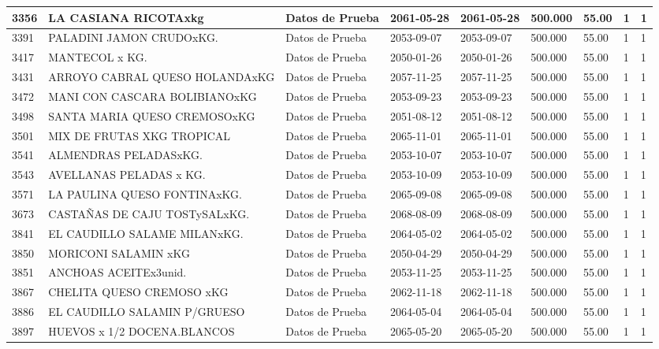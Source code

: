 \documentclass[a4paper,12pt]{article}
\begin{document}
\begin{landscape}
\begin{longtable}{|p{4cm}|p{2.5cm}|p{2.5cm}|p{1.8cm}|p{1.8cm}|p{1cm}|p{1cm}|p{3cm}|p{3cm}||}
3356 & LA CASIANA RICOTAxkg & Datos de Prueba & 2061-05-28 & 2061-05-28 & 500.000 & 55.00 & 1 & 1 \\ \hline 
3391 & PALADINI JAMON CRUDOxKG. & Datos de Prueba & 2053-09-07 & 2053-09-07 & 500.000 & 55.00 & 1 & 1 \\ \hline 
3417 & MANTECOL x KG. & Datos de Prueba & 2050-01-26 & 2050-01-26 & 500.000 & 55.00 & 1 & 1 \\ \hline 
3431 & ARROYO CABRAL QUESO HOLANDAxKG & Datos de Prueba & 2057-11-25 & 2057-11-25 & 500.000 & 55.00 & 1 & 1 \\ \hline 
3472 & MANI CON CASCARA BOLIBIANOxKG & Datos de Prueba & 2053-09-23 & 2053-09-23 & 500.000 & 55.00 & 1 & 1 \\ \hline 
3498 & SANTA MARIA QUESO CREMOSOxKG & Datos de Prueba & 2051-08-12 & 2051-08-12 & 500.000 & 55.00 & 1 & 1 \\ \hline 
3501 & MIX DE FRUTAS XKG TROPICAL & Datos de Prueba & 2065-11-01 & 2065-11-01 & 500.000 & 55.00 & 1 & 1 \\ \hline 
3541 & ALMENDRAS PELADASxKG. & Datos de Prueba & 2053-10-07 & 2053-10-07 & 500.000 & 55.00 & 1 & 1 \\ \hline 
3543 & AVELLANAS PELADAS x KG. & Datos de Prueba & 2053-10-09 & 2053-10-09 & 500.000 & 55.00 & 1 & 1 \\ \hline 
3571 & LA PAULINA QUESO FONTINAxKG. & Datos de Prueba & 2065-09-08 & 2065-09-08 & 500.000 & 55.00 & 1 & 1 \\ \hline 
3673 & CASTAÑAS DE CAJU TOSTySALxKG. & Datos de Prueba & 2068-08-09 & 2068-08-09 & 500.000 & 55.00 & 1 & 1 \\ \hline 
3841 & EL CAUDILLO SALAME MILANxKG. & Datos de Prueba & 2064-05-02 & 2064-05-02 & 500.000 & 55.00 & 1 & 1 \\ \hline 
3850 & MORICONI SALAMIN xKG & Datos de Prueba & 2050-04-29 & 2050-04-29 & 500.000 & 55.00 & 1 & 1 \\ \hline 
3851 & ANCHOAS ACEITEx3unid. & Datos de Prueba & 2053-11-25 & 2053-11-25 & 500.000 & 55.00 & 1 & 1 \\ \hline 
3867 & CHELITA QUESO CREMOSO xKG & Datos de Prueba & 2062-11-18 & 2062-11-18 & 500.000 & 55.00 & 1 & 1 \\ \hline 
3886 & EL CAUDILLO SALAMIN P/GRUESO & Datos de Prueba & 2064-05-04 & 2064-05-04 & 500.000 & 55.00 & 1 & 1 \\ \hline 
3897 & HUEVOS x 1/2 DOCENA.BLANCOS & Datos de Prueba & 2065-05-20 & 2065-05-20 & 500.000 & 55.00 & 1 & 1 \\ \hline 

\end{longtable}
\end{landscape}
\end{document}
